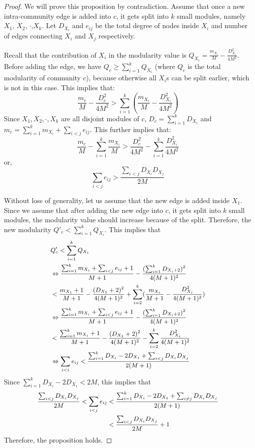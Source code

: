 \begin{proof}
We will prove this proposition by contradiction.
Assume that once a new intra-community edge is added into $c$, it gets split into $k$ small modules, namely $X_1$, $X_2$, $\cdot$,$X_k$. Let $D_{X_i}$ and $e_{ij}$ be the total degree of nodes inside $X_i$ and number of edges connecting $X_i$ and $X_j$ respectively. 


Recall that the contribution of $X_i$ in the modularity value is $Q_{X_i}=\frac{m_{X_i}}{M} - \frac{D_{X_i}^2}{4M^2}$.  Before adding the edge, we have $Q_c \geq \sum_{i=1}^k Q_{X_i}$ (where $Q_c$ is the total modularity of community $c$), because otherwise all $X_i$s can be split earlier, which is not in this case. This implies that:
\[
\frac{m_c}{M}- \frac{D_c^2}{4M^2} > \sum_{i=1}^k (\frac{m_{X_i}}{M} - \frac{D_{X_i}^2}{4M^2})
\]
Since $X_1,X_2,\cdot,X_k$ are all disjoint modules of $c$, $D_c=\sum_{i=1}^k D_{X_i}$ and $m_c=\sum_{i=1}^k m_{X_i} + \sum_{i<j} e_{ij}$. This further implies that:
\[
\frac{m_c}{M}-\sum_{i=1}^k \frac{m_{X_i}}{M} > \frac{D_c^2}{4M^2}- \sum_{i=1}^k \frac{D_{X_i}^2}{4M^2}
\]
or,
\[
\sum_{i<j} e_{ij} > \frac{\sum_{i<j} D_{X_i}D_{X_j}}{2M}
\]
 
 Without loss of generality, let us assume that the new edge is added inside $X_1$. 
Since we assume that after adding the new edge into $c$, it gets split into $k$ small modules, the modularity value should increase because of the split. Therefore, the new modularity $Q'_c<\sum_{i=1}^k Q_{X_i}$. This implies that
\[\small
\begin{split}\small
& Q'_c < \sum_{i=1}^k Q_{X_i}\\
& \Leftrightarrow \frac{\sum_{i=1}^k m_{X_i} + \sum_{i<j} e_{ij} + 1}{M+1} - \frac{(\sum_{i=1}^k D_{X_i +2})^2}{4(M+1)^2}\\
& <  \frac{m_{X_1}+1}{M+1} - \frac{(D_{X_1}+2)^2}{4(M+1)^2}  + \sum_{i=2}^k  (\frac{m_{X_i}}{M+1} - \frac{D_{X_i}^2}{4(M+1)^2} )\\
&\Leftrightarrow \frac{\sum_{i=1}^k m_{X_i} + \sum_{i<j} e_{ij} + 1}{M+1} - \frac{(\sum_{i=1}^k D_{X_i +2})^2}{4(M+1)^2}\\
& < \frac{\sum_{i=1}^k m_{X_i}+1}{M+1} - \frac{(D_{X_1}+2)^2}{4(M+1)^2} - \sum_{i=2}^k \frac{D_{X_i}^2}{4(M+1)^2}\\
&\Leftrightarrow \sum_{i<i} e_{ij} < \frac{\sum_{i=1}^k D_{X_i} - 2 D_{X_1} + \sum_{i<j} D_{X_i}D_{X_j}}{2(M+1)}
\end{split}
\]
Since $\sum_{i=1}^k D_{X_i} - 2D_{X_1} < 2M$, this implies that 
\[\small
\begin{split}
\frac{\sum_{i<j}D_{X_i}D_{X_j}}{2M}  < \sum_{i<j}e_{ij} 
&< \frac{\sum_{i=1}^k D_{X_i} - 2D_{X_1} + \sum_{i\neq j}{D_{X_i}D_{X_j}}}{2(M+1)}\\
& <\frac{\sum_{i<j}D_{X_i}D_{X_j}}{2M}+1
\end{split}
\]
Therefore, the proposition holds.
\end{proof}






